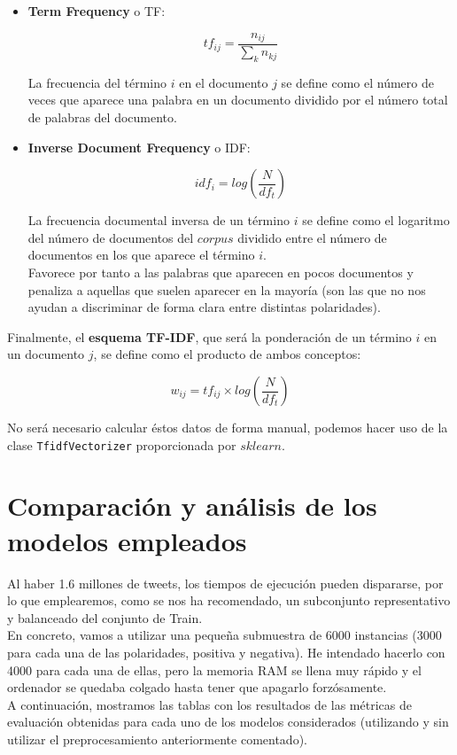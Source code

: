 \documentclass[a4paper,12pt]{report}
\begin{document}
\begin{itemize}

\item \textbf{Term Frequency} o TF:

\[ tf_{ij} = \frac{n_{ij}}{\sum_{k} n_{kj}}  \]

{\setlength{\parindent}{0cm}
La frecuencia del término $i$ en el documento $j$ se define como el número de veces que aparece una palabra en un documento dividido por el número total de palabras del documento. }


\item \textbf{Inverse Document Frequency} o IDF:

\[ idf_i = log \left( \frac{N}{df_t} \right) \]

{\setlength{\parindent}{0cm}
La frecuencia documental inversa de un término $i$ se define como el logaritmo del número de documentos del $corpus$ dividido entre el número de documentos en los que aparece el término $i$.} \vspace{2mm}\\
Favorece por tanto a las palabras que aparecen en pocos documentos y penaliza a aquellas que suelen aparecer en la mayoría (son las que no nos ayudan a discriminar de forma clara entre distintas polaridades). 

\end{itemize}
\vspace{2mm}

{\setlength{\parindent}{0cm}
Finalmente, el \textbf{esquema TF-IDF}, que será la ponderación de un término $i$ en un documento $j$, se define como el producto de ambos conceptos:}

\[ w_{ij} = tf_{ij} \times log \left( \frac{N}{df_t} \right) \] 

\vspace{2mm}
{\setlength{\parindent}{0cm}
No será necesario calcular éstos datos de forma manual, podemos hacer uso de la clase
\texttt{TfidfVectorizer} proporcionada por $sklearn$. }
\vspace{4mm}

\section{Comparación y análisis de los modelos empleados}

{\setlength{\parindent}{0cm}
Al haber 1.6 millones de tweets, los tiempos de ejecución pueden dispararse, por lo
que emplearemos, como se nos ha recomendado, un subconjunto representativo y
balanceado del conjunto de Train.}
\vspace{2mm}\\
En concreto, vamos a utilizar una pequeña submuestra de 6000 instancias (3000 para cada una de las polaridades, positiva y negativa). He intendado hacerlo con 4000 para cada una de ellas, pero la memoria RAM se llena muy rápido y el ordenador se quedaba colgado hasta tener que apagarlo forzósamente. 
\vspace{2mm}\\
A continuación, mostramos las tablas con los resultados de las métricas de evaluación obtenidas para cada uno de los modelos considerados (utilizando y sin utilizar el preprocesamiento anteriormente comentado).
\clearpage
\end{document}
